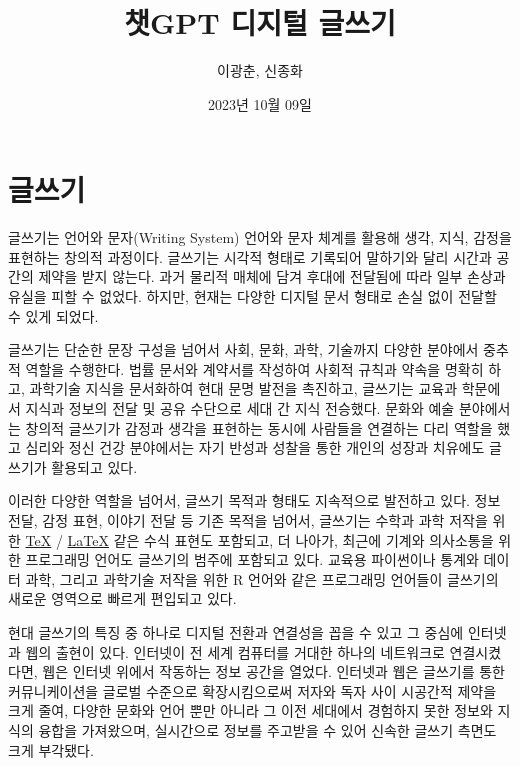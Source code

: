 \documentclass[
  letterpaper,
]{book}
\title{챗GPT 디지털 글쓰기}
\author{이광춘, 신종화}
\date{2023년 10월 09일}
\renewcommand*\contentsname{목차}
\newcommand\contentsname{목차}
\begin{document}
\frontmatter
\maketitle
\renewcommand*\contentsname{목차}
{
\hypersetup{linkcolor=}
\setcounter{tocdepth}{2}
\tableofcontents
}
\mainmatter
{}

\hypertarget{uxae00uxc4f0uxae30}{%
\chapter{글쓰기}\label{uxae00uxc4f0uxae30}}

글쓰기는 언어와 문자(Writing System) 언어와 문자 체계를 활용해 생각,
지식, 감정을 표현하는 창의적 과정이다. 글쓰기는 시각적 형태로 기록되어
말하기와 달리 시간과 공간의 제약을 받지 않는다. 과거 물리적 매체에 담겨
후대에 전달됨에 따라 일부 손상과 유실을 피할 수 없었다. 하지만, 현재는
다양한 디지털 문서 형태로 손실 없이 전달할 수 있게 되었다.

글쓰기는 단순한 문장 구성을 넘어서 사회, 문화, 과학, 기술까지 다양한
분야에서 중추적 역할을 수행한다. 법률 문서와 계약서를 작성하여 사회적
규칙과 약속을 명확히 하고, 과학기술 지식을 문서화하여 현대 문명 발전을
촉진하고, 글쓰기는 교육과 학문에서 지식과 정보의 전달 및 공유 수단으로
세대 간 지식 전승했다. 문화와 예술 분야에서는 창의적 글쓰기가 감정과
생각을 표현하는 동시에 사람들을 연결하는 다리 역할을 했고 심리와 정신
건강 분야에서는 자기 반성과 성찰을 통한 개인의 성장과 치유에도 글쓰기가
활용되고 있다.

이러한 다양한 역할을 넘어서, 글쓰기 목적과 형태도 지속적으로 발전하고
있다. 정보 전달, 감정 표현, 이야기 전달 등 기존 목적을 넘어서, 글쓰기는
수학과 과학 저작을 위한 \href{http://example.org}{\TeX} /
\href{http://example.org}{\LaTeX} 같은 수식 표현도 포함되고, 더 나아가,
최근에 기계와 의사소통을 위한 프로그래밍 언어도 글쓰기의 범주에 포함되고
있다. 교육용 파이썬이나 통계와 데이터 과학, 그리고 과학기술 저작을 위한
R 언어와 같은 프로그래밍 언어들이 글쓰기의 새로운 영역으로 빠르게
편입되고 있다.

현대 글쓰기의 특징 중 하나로 디지털 전환과 연결성을 꼽을 수 있고 그
중심에 인터넷과 웹의 출현이 있다. 인터넷이 전 세계 컴퓨터를 거대한
하나의 네트워크로 연결시켰다면, 웹은 인터넷 위에서 작동하는 정보 공간을
열었다. 인터넷과 웹은 글쓰기를 통한 커뮤니케이션을 글로벌 수준으로
확장시킴으로써 저자와 독자 사이 시공간적 제약을 크게 줄여, 다양한 문화와
언어 뿐만 아니라 그 이전 세대에서 경험하지 못한 정보와 지식의 융합을
가져왔으며, 실시간으로 정보를 주고받을 수 있어 신속한 글쓰기 측면도 크게
부각됐다.
\end{document}
